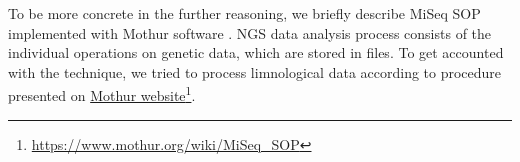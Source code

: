 \documentclass[a4paper]{jpconf}
\begin{document}
To be more concrete in the further reasoning, we briefly describe MiSeq SOP implemented with Mothur software \cite{mothur}.  NGS data analysis process consists of the individual operations on genetic data, which are stored in files. To get accounted with the technique, we tried to process limnological data \cite{mik19} according to procedure presented on \href{https://www.mothur.org/wiki/MiSeq_SOP}{Mothur website}\footnote{\url{https://www.mothur.org/wiki/MiSeq_SOP}}. %




\end{document}
